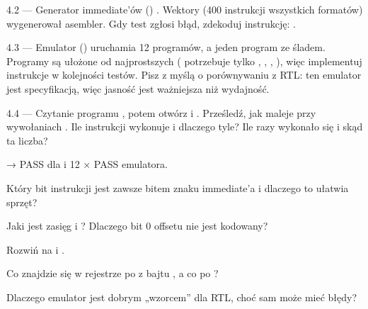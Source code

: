 \begin{zadanie}{4.2 --- Generator immediate'ów ()}
. Wektory (400 instrukcji wszystkich formatów) wygenerował
asembler. Gdy test zgłosi błąd, zdekoduj instrukcję: .
\end{zadanie}

\begin{zadanie}{4.3 --- Emulator ()}
 uruchamia 12 programów, a 
jeden program ze śladem. Programy są ułożone od najprostszych (
potrzebuje tylko , , , ), więc
implementuj instrukcje w kolejności testów. Pisz z myślą o porównywaniu z RTL:
ten emulator jest specyfikacją, więc jasność jest ważniejsza niż wydajność.
\end{zadanie}

\begin{zadanie}{4.4 --- Czytanie programu}
, potem otwórz  i
. Prześledź, jak  maleje przy wywołaniach
. Ile instrukcji wykonuje  i dlaczego tyle? Ile
razy wykonało się  i skąd ta liczba?
\end{zadanie}

\begin{gotowe}
 → PASS dla  i 12 × PASS emulatora.
\end{gotowe}

\begin{kontrolne}
  \item Który bit instrukcji jest zawsze bitem znaku immediate'a i dlaczego to ułatwia sprzęt?
  \item Jaki jest zasięg  i ? Dlaczego bit 0 offsetu nie jest kodowany?
  \item Rozwiń  na  i .
  \item Co znajdzie się w rejestrze po  z bajtu , a co po ?
  \item Dlaczego emulator jest dobrym „wzorcem” dla RTL, choć sam może mieć błędy?
\end{kontrolne}
